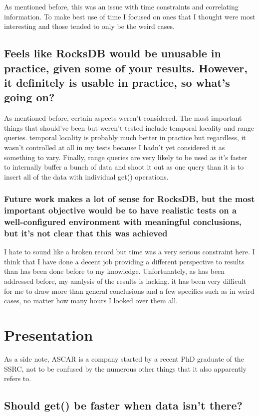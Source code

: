 \documentclass[11pt]{article}
\begin{document}
As mentioned before, this was an issue with time constraints and correlating
information. To make best use of time I focused on ones that I thought were most
interesting and those tended to only be the weird cases.

\subsection{Feels like RocksDB would be unusable in practice, given some of your
results. However, it definitely is usable in practice, so what's going on?}

As mentioned before, certain aspects weren't considered. The most important
things that should've been but weren't tested include temporal locality and
range queries. temporal locality is probably much better in practice but
regardless, it wasn't controlled at all in my tests because I hadn't yet
considered it as something to vary. Finally, range queries are very likely to be
used as it's faster to internally buffer a bunch of data and shoot it out as one
query than it is to insert all of the data with individual get() operations.

\subsubsection{Future work makes a lot of sense for RocksDB, but the most
  important objective would be to have realistic tests on a well-configured
  environment with meaningful conclusions, but it's not clear that this was
achieved}

I hate to sound like a broken record but time was a very serious constraint
here. I think that I have done a decent job providing a different perspective to
results than has been done before to my knowledge. Unfortunately, as has been
addressed before, my analysis of the results is lacking. it has been very
difficult for me to draw more than general conclusions and a few specifics such
as in weird cases, no matter how many hours I looked over them all.

\section{Presentation}

As a side note, ASCAR is a company started by a recent PhD graduate of the SSRC,
not to be confused by the numerous other things that it also apparently refers
to.

\subsection{Should get() be faster when data isn't there?}
\end{document}
